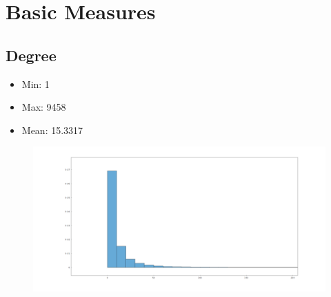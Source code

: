 \documentclass[]{article}
\begin{document}
    \section{Basic Measures}
    
    \subsection*{Degree}
    \begin{itemize}
        \item Min: 1
        \item Max: 9458
        \item Mean: 15.3317
    \end{itemize}

    \begin{figure}[htp]
        \centering
        \includegraphics[scale=0.20]{./charts/degree_distribution.png}
    \end{figure}

    
\end{document}
